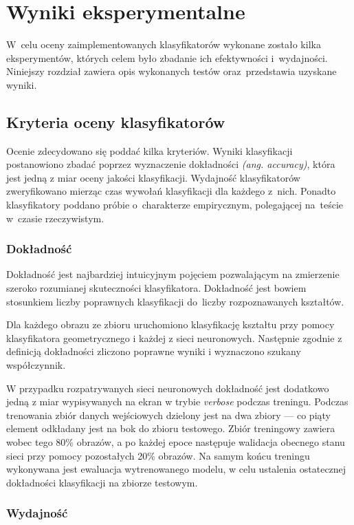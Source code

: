 \documentclass[11pt,a4paper]{article}
\begin{document}
\section{Wyniki eksperymentalne}

W~celu oceny zaimplementowanych klasyfikatorów wykonane zostało kilka eksperymentów, których celem było zbadanie ich efektywności i~wydajności.
Niniejszy rozdział zawiera opis wykonanych testów oraz~przedstawia uzyskane wyniki.

\subsection{Kryteria oceny klasyfikatorów}

Ocenie zdecydowano się poddać kilka kryteriów. Wyniki klasyfikacji postanowiono zbadać poprzez wyznaczenie dokładności \emph{(ang. accuracy)}, która jest jedną z miar oceny jakości klasyfikacji. Wydajność klasyfikatorów zweryfikowano mierząc czas wywołań klasyfikacji dla każdego z~nich. Ponadto klasyfikatory poddano próbie o~charakterze empirycznym, polegającej na~teście w~czasie rzeczywistym. 

\subsubsection{Dokładność}

Dokładność jest najbardziej intuicyjnym pojęciem pozwalającym na zmierzenie szeroko rozumianej skuteczności klasyfikatora. Dokładność jest bowiem stosunkiem liczby poprawnych klasyfikacji do~liczby rozpoznawanych kształtów.

Dla każdego obrazu ze zbioru \cite{shapes} uruchomiono klasyfikację kształtu przy pomocy klasyfikatora geometrycznego i każdej z sieci neuronowych. Następnie zgodnie z definicją dokładności zliczono poprawne wyniki i wyznaczono szukany współczynnik.

W przypadku rozpatrywanych sieci neuronowych dokładność jest dodatkowo jedną z miar wypisywanych na ekran w trybie \emph{verbose} podczas treningu. Podczas trenowania zbiór danych wejściowych dzielony jest na dwa zbiory --- co piąty element odkładany jest na bok do zbioru testowego. Zbiór treningowy zawiera wobec tego 80\% obrazów, a po każdej epoce następuje walidacja obecnego stanu sieci przy pomocy pozostałych 20\% obrazów. Na samym końcu treningu wykonywana jest ewaluacja wytrenowanego modelu, w celu ustalenia ostatecznej dokładności klasyfikacji na zbiorze testowym.

\subsubsection{Wydajność}
\end{document}
